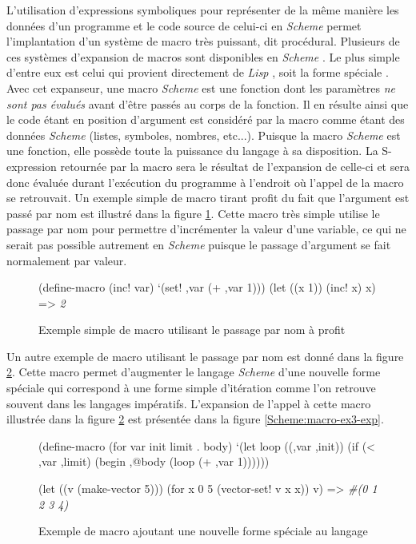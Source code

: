 \documentclass[12pt,twoside,letterpaper,francais]{book}
\newcommand{\lisp}{{\textit{Lisp }}}
\newcommand{\Schemelang}{{\textit{Scheme }}}
\newcommand{\scheme}[1]{\selectlanguage{english}{\tt #1}\selectlanguage{french}}
\newcommand{\schemeresult}[1]{{\it #1}}
\begin{document}
L'utilisation d'expressions symboliques pour représenter de la même
manière les données d'un programme et le code source de celui-ci en
\Schemelang permet l'implantation d'un système de macro très puissant,
dit procédural. Plusieurs de ces systèmes d'expansion de macros sont
disponibles en \Schemelang. Le plus simple d'entre eux est celui qui
provient directement de \lisp, soit la forme spéciale
\scheme{define-macro}. Avec cet expanseur, une macro \Schemelang est
une fonction dont les paramètres \emph{ne sont pas évalués} avant
d'être passés au corps de la fonction. Il en résulte ainsi que le code
étant en position d'argument est considéré par la macro comme étant
des données \Schemelang (listes, symboles, nombres, etc...). Puisque
la macro \Schemelang est une fonction, elle possède toute la puissance
du langage à sa disposition. La S-expression retournée par la macro
sera le résultat de l'expansion de celle-ci et sera donc évaluée
durant l'exécution du programme à l'endroit où l'appel de la macro se
retrouvait. Un exemple simple de macro tirant profit du fait que
l'argument est passé par nom est illustré dans la figure
\ref{Scheme:macro-ex2}. Cette macro très simple utilise le passage par
nom pour permettre d'incrémenter la valeur d'une variable, ce qui ne
serait pas possible autrement en \Schemelang puisque le passage
d'argument se fait normalement par valeur.

\begin{figure}[htb!]
  \begin{schemecode}
(define-macro (inc! var) `(set! ,var (+ ,var 1)))
(let ((x 1))
    (inc! x)
    x) => \schemeresult{2}
  \end{schemecode}
  \caption{Exemple simple de macro utilisant le passage par nom à profit}
  \label{Scheme:macro-ex2}
\end{figure}


Un autre exemple de macro utilisant le passage par nom est donné dans
la figure \ref{Scheme:macro-ex3}. Cette macro permet d'augmenter le
langage \Schemelang d'une nouvelle forme spéciale qui correspond à une
forme simple d'itération comme l'on retrouve souvent dans les langages
impératifs. L'expansion de l'appel à cette macro illustrée dans la
figure \ref{Scheme:macro-ex3} est présentée dans la figure
\ref{Scheme:macro-ex3-exp}.

\begin{figure}[htb!]
  \begin{schemecode}
(define-macro (for var init limit . body)
  `(let loop ((,var ,init))
     (if (< ,var ,limit)
         (begin ,@body
                (loop (+ ,var 1))))))

(let ((v (make-vector 5)))
  (for x 0 5 (vector-set! v x x))
  v) => \schemeresult{\#(0 1 2 3 4)}
  \end{schemecode}
  \caption{Exemple de macro ajoutant une nouvelle forme spéciale au langage}
  \label{Scheme:macro-ex3}
\end{figure}
\end{document}
